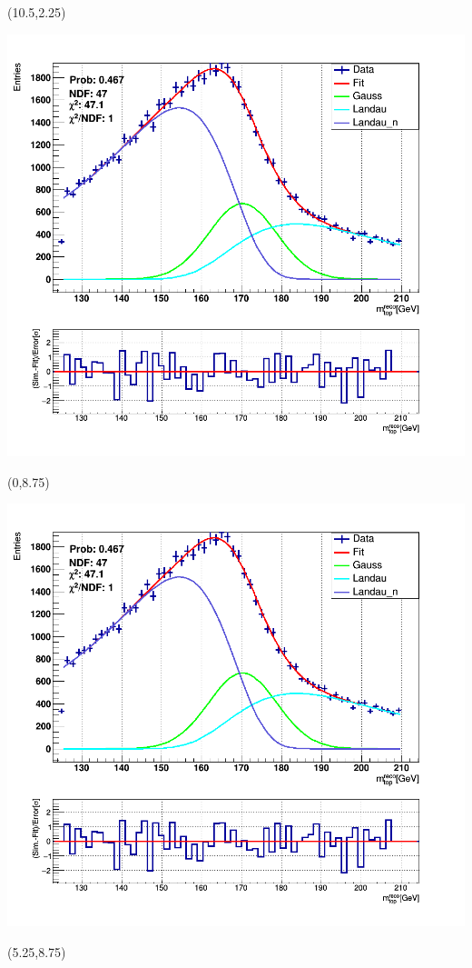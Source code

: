 \documentclass[green,compress,10pt]{beamer}
\begin{document}
{\begin{textblock}{7.5}
		
	\end{textblock}	
	
	\begin{textblock}{7.5}(10.5,2.25)
		
		\includegraphics[width=0.725\linewidth]{PicsTop/170mtop.png}
		
		
	\end{textblock}	
	
	
	
	
	\begin{textblock}{7.5}(0,8.75)
		
		\includegraphics[width=0.725\linewidth]{PicsTop/170mtop.png}
		
		
	\end{textblock}	
	
	\begin{textblock}{7.5}(5.25,8.75)
		

\end{textblock}}
\end{document}
